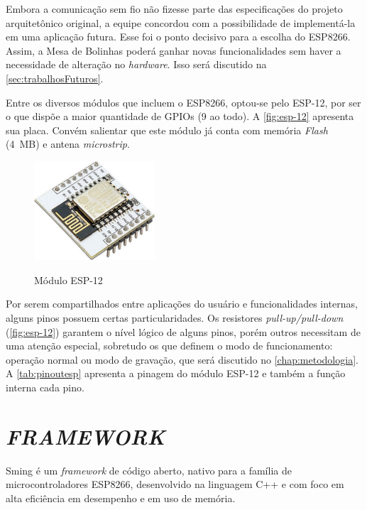 Embora a comunicação sem fio não fizesse parte das especificações do projeto arquitetônico original, a equipe concordou com a possibilidade de implementá-la em uma aplicação futura. Esse foi o ponto decisivo para a escolha do ESP8266. Assim, a Mesa de Bolinhas poderá ganhar novas funcionalidades sem haver a necessidade de alteração no \emph{hardware}. Isso será discutido na \autoref{sec:trabalhosFuturos}.

Entre os diversos módulos que incluem o ESP8266, optou-se pelo ESP-12, por ser o que dispõe a maior quantidade de GPIOs (9 ao todo). A \autoref{fig:esp-12} apresenta sua placa. Convém salientar que este módulo já conta com memória \emph{Flash} (4\ MB) e antena \emph{microstrip}.

\begin{figure}[H]
    \centering
    \caption{Módulo ESP-12}
    \includegraphics[width=0.4\textwidth]{./dados/figuras/esp-12}
    \label{fig:esp-12}
\end{figure}

Por serem compartilhados entre aplicações do usuário e funcionalidades internas, alguns pinos possuem certas particularidades. Os resistores  \emph{pull-up/pull-down} (\autoref{fig:esp-12}) garantem o nível lógico de alguns pinos, porém outros necessitam de uma atenção especial, sobretudo os que definem o modo de funcionamento: operação normal ou modo de gravação, que será discutido no \autoref{chap:metodologia}. A \autoref{tab:pinoutesp} apresenta a pinagem do módulo ESP-12 e também a função interna cada pino.



\section{\emph{FRAMEWORK}}
\label{sec:framework}

Sming é um \emph{framework} de código aberto, nativo para a família de microcontroladores ESP8266, desenvolvido na linguagem {C++} e com foco em alta eficiência em desempenho e em uso de memória.

